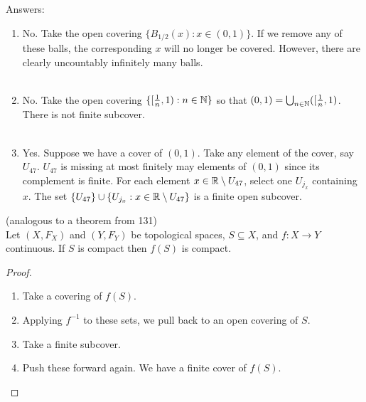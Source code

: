 Answers: 
\begin{enumerate}
	\item No. Take the open covering $\{B_{1/2}(x) : x \in (0,1)\}$. If we remove any of these balls, the corresponding $x$ will no longer be covered. However, there are clearly uncountably infinitely many balls. \\\\
	\item No. Take the open covering $\{[\frac{1}{n}, 1) : n \in \mathbb N\}$ so that $(0,1) = \bigcup_{n \in \mathbb N}([\frac{1}{n}, 1)$. There is not finite subcover. \\\\
	\item Yes. Suppose we have a cover of $(0,1)$. Take any element of the cover, say $U_{47}$. $U_{47}$ is missing at most finitely may elements of $(0,1)$ since its complement is finite. For each element $x \in \mathbb R \setminus U_{47}$, select one $U_{j_x}$ containing $x$. The set $\{U_{47}\} \cup \{U_{j_x}: x \in \mathbb R \setminus U_{47}\}$ is a finite open subcover. 
\end{enumerate}
\begin{theorem}
	(analogous to a theorem from 131)\\
	Let $(X, F_X)$ and $(Y, F_Y)$ be topological spaces, $S \subseteq X$, and $f : X \rightarrow Y$ continuous. If $S$ is compact then $f(S)$ is compact. 
\end{theorem}
\begin{proof}
	\begin{enumerate}
		\item Take a covering of $f(S)$. 
		\item Applying $f^{-1}$ to these sets, we pull back to an open covering of $S$. 
		\item Take a finite subcover. 
		\item Push these forward again. We have a finite cover of $f(S)$. 
	\end{enumerate}
\end{proof}

